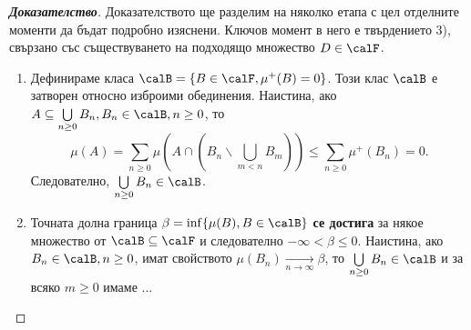 \begin{proof}[\textbf{Доказателство}]
Доказателството ще разделим на няколко етапа с цел отделните моменти да бъдат
подробно изяснени. Ключов момент в него е твърдението 3), свързано със съществуването
на подходящо множество $D \in \calF$.
\begin{enumerate}[\indent A.]
\item\label{4.A}
Дефинираме класа $\calB = \{B \in \calF, \mu^{+}(B)=0\}$. Този клас $\calB$
е затворен относно изброими обединения. Наистина, ако $A \subseteq \bigcup\limits
_{n \geq 0} B_{n}, B_{n} \in \calB, n \geq 0$, то
\[
\mu(A) = \sum\limits_{n \geq 0}\mu(A \cap (B_{n}\backslash\bigcup\limits_{m<n}
B_{m})) \leq \sum\limits_{n \geq 0} \mu^{+}(B_{n})=0.
\]
Следователно, $\bigcup\limits_{n \geq 0}B_{n} \in  \calB$.
\item\label{4.B}
Точната долна граница $\beta=\inf\{\mu(B),B \in \calB\}$ \textbf{се достига} за
някое множество от $\calB \subseteq \calF$ и следователно $-\infty < \beta \leq
0$. Наистина, ако $B_{n} \in \calB, n \geq 0$, имат свойството $\mu(B_{n})
\xrightarrow[n \rightarrow \infty]{}\beta$, то $\bigcup\limits_{n \geq
0}B_{n} \in \calB$ и за всяко $m \geq 0$ имаме ...
\end{enumerate}
\end{proof}
